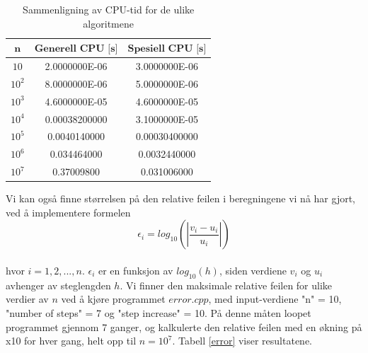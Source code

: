 \documentclass{article}
\begin{document}
\FloatBarrier
\begin{table}[!ht]
\caption{Sammenligning av CPU-tid for de ulike algoritmene}
\centering
\label{CPUgauss}
\begin{tabular}{|c|c|c|}
\hline
$\textbf{n}$      &  $\textbf{Generell CPU [s]}$ & $\textbf{Spesiell CPU [s]}$ \\ 
\hline
$10$     & 2.0000000E-06                  & 3.0000000E-06                  \\ 
\hline
$10^2$ & 8.0000000E-06                  & 5.0000000E-06                  \\ 
\hline
$10^3$ & 4.6000000E-05                  & 4.6000000E-05                  \\ 
\hline
$10^4$ & 0.00038200000                  & 3.1000000E-05                  \\ 
\hline
$10^5$ & 0.0040140000                   & 0.00030400000                   \\ 
\hline
$10^6$ & 0.034464000                    &  0.0032440000          \\ 
\hline       
$10^7$ &  0.37009800                      & 0.031006000     \\
\hline
\end{tabular}
\end{table}
\FloatBarrier


Vi kan også finne størrelsen på den relative feilen i beregningene vi nå har gjort, ved å implementere formelen 
\begin{equation}
\epsilon_i = log_{10} \left(\left| \frac{v_i - u_i}{u_i} \right| \right)
\end{equation} \\

hvor $i = 1, 2, ..., n$. $\epsilon_i$ er en funksjon av $log_{10}(h)$, siden verdiene $v_i$ og $u_i$ avhenger av steglengden $h$. Vi finner den maksimale relative feilen for ulike verdier av $n$ ved å kjøre programmet $\textit{error.cpp}$, med input-verdiene "n" = 10, "number of steps" = 7 og "step increase" = 10. På denne måten loopet programmet gjennom 7 ganger, og kalkulerte den relative feilen med en økning på x10 for hver gang, helt opp til $n = 10^7$. Tabell \ref{error} viser resultatene.   
\end{document}
